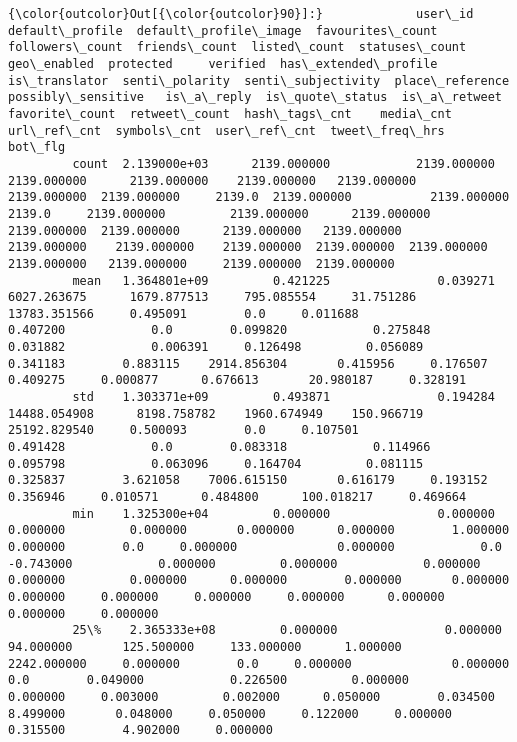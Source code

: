 \documentclass[11pt]{article}
\begin{document}
\begin{Verbatim}[commandchars=\\\{\}]
{\color{outcolor}Out[{\color{outcolor}90}]:}             user\_id  default\_profile  default\_profile\_image  favourites\_count  followers\_count  friends\_count  listed\_count  statuses\_count  geo\_enabled  protected     verified  has\_extended\_profile  is\_translator  senti\_polarity  senti\_subjectivity  place\_reference  possibly\_sensitive   is\_a\_reply  is\_quote\_status  is\_a\_retweet  favorite\_count  retweet\_count  hash\_tags\_cnt    media\_cnt  url\_ref\_cnt  symbols\_cnt  user\_ref\_cnt  tweet\_freq\_hrs      bot\_flg
         count  2.139000e+03      2139.000000            2139.000000       2139.000000      2139.000000    2139.000000   2139.000000     2139.000000  2139.000000     2139.0  2139.000000           2139.000000         2139.0     2139.000000         2139.000000      2139.000000         2139.000000  2139.000000      2139.000000   2139.000000     2139.000000    2139.000000    2139.000000  2139.000000  2139.000000  2139.000000   2139.000000     2139.000000  2139.000000
         mean   1.364801e+09         0.421225               0.039271       6027.263675      1679.877513     795.085554     31.751286    13783.351566     0.495091        0.0     0.011688              0.407200            0.0        0.099820            0.275848         0.031882            0.006391     0.126498         0.056089      0.341183        0.883115    2914.856304       0.415956     0.176507     0.409275     0.000877      0.676613       20.980187     0.328191
         std    1.303371e+09         0.493871               0.194284      14488.054908      8198.758782    1960.674949    150.966719    25192.829540     0.500093        0.0     0.107501              0.491428            0.0        0.083318            0.114966         0.095798            0.063096     0.164704         0.081115      0.325837        3.621058    7006.615150       0.616179     0.193152     0.356946     0.010571      0.484800      100.018217     0.469664
         min    1.325300e+04         0.000000               0.000000          0.000000         0.000000       0.000000      0.000000        1.000000     0.000000        0.0     0.000000              0.000000            0.0       -0.743000            0.000000         0.000000            0.000000     0.000000         0.000000      0.000000        0.000000       0.000000       0.000000     0.000000     0.000000     0.000000      0.000000        0.000000     0.000000
         25\%    2.365333e+08         0.000000               0.000000         94.000000       125.500000     133.000000      1.000000     2242.000000     0.000000        0.0     0.000000              0.000000            0.0        0.049000            0.226500         0.000000            0.000000     0.003000         0.002000      0.050000        0.034500       8.499000       0.048000     0.050000     0.122000     0.000000      0.315500        4.902000     0.000000

\end{Verbatim}
\end{document}
